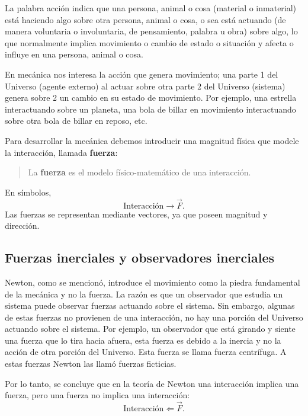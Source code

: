 \documentclass[../apunte_mecanica_clasica.tex]{subfiles}%
\begin{document}
La palabra acción indica que una persona, animal o cosa (material o inmaterial) está haciendo algo sobre otra persona, animal o cosa, o sea está actuando (de manera voluntaria o involuntaria, de pensamiento, palabra u obra) sobre algo, lo que normalmente implica movimiento o cambio de estado o situación y afecta o influye en una persona, animal o cosa.

En mecánica nos interesa la acción que genera movimiento; una parte 1 del Universo (agente externo) al actuar sobre otra parte 2 del Universo (sistema) genera sobre 2 un cambio en su estado de movimiento. Por ejemplo, una estrella interactuando sobre un planeta, una bola de billar en movimiento interactuando sobre otra bola de billar en reposo, etc.

Para desarrollar la mecánica debemos introducir una magnitud física que modele la interacción, llamada \textbf{fuerza}:
\begin{quote}
La \textbf{fuerza} es el modelo físico-matemático de una interacción.
\end{quote}

En símbolos,
\begin{equation*}
\text{Interacción} \longrightarrow \vec F .
\end{equation*}
Las fuerzas se representan mediante vectores, ya que poseen magnitud y dirección.

\subsection{Fuerzas inerciales y observadores inerciales}

Newton, como se mencionó, introduce el movimiento como la piedra fundamental de la mecánica y no la fuerza. La razón es que un observador que estudia un sistema puede observar fuerzas actuando sobre el sistema. Sin embargo, algunas de estas fuerzas no provienen de una interacción, no hay una porción del Universo actuando sobre el sistema. Por ejemplo, un observador que está girando y siente una fuerza que lo tira hacia afuera, esta fuerza es debido a la inercia y no la acción de otra porción del Universo. Esta fuerza se llama fuerza centrífuga. A estas fuerzas Newton las llamó fuerzas ficticias.

Por lo tanto, se concluye que en la teoría de Newton una interacción implica una fuerza, pero una fuerza no implica una interacción:
\begin{equation*}
\text{Interacción} \Longleftarrow \vec F.
\end{equation*}
\end{document}

